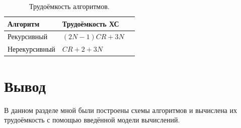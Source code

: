 \begin{table}[!htbp]
	\centering
	\caption{Трудоёмкость алгоритмов.}
	\small
	\begin{tabularx}{\textwidth}{|*{3}{X|}}
		\hline
		\textbf{Алгоритм} & \textbf{Трудоёмкость ХС} \\\hline
		Рекурсивный & $(2N - 1)\mathrel{CR} + 3N$ \\\hline
		Нерекурсивный & $\mathrel{CR} + 2 + 3N$ \\\hline 
	\end{tabularx}
\end{table}

\FloatBarrier

\section*{Вывод}

В данном разделе мной были построены схемы алгоритмов и вычислена их трудоёмкость с помощью введённой модели вычислений.

\clearpage
